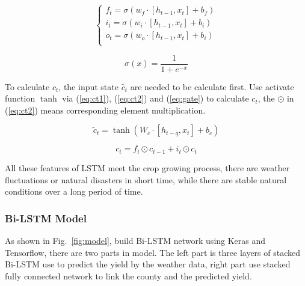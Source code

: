 \documentclass[conference]{IEEEtran}
\begin{document}
      \begin{equation}
        \begin{cases}	f_t=\sigma \left( w_f\cdot \left[ h_{t-1},x_t \right] +b_f \right)\\	i_t=\sigma \left( w_i\cdot \left[ h_{t-1},x_t \right] +b_i \right)\\	o_t=\sigma \left( w_o\cdot \left[ h_{t-1},x_t \right] +b_i \right)\\\end{cases}
        \label{eq:gate}
      \end{equation}

      \begin{equation}
        \sigma \left( x \right) =\frac{1}{1+e^{-x}}
        \label{eq:sigmoid}
      \end{equation}

      To calculate $c_t$, the input state $\widetilde{c_t}$ are needed to be calculate first. Use activate function $\tanh$ via (\ref{eq:ct1}), (\ref{eq:ct2}) and (\ref{eq:gate}) to calculate $c_t$, the $\odot$ in (\ref{eq:ct2}) means corresponding element multiplication.

      \begin{equation}
        \tilde{c}_t=\tanh \left( W_c\cdot \left[ h_{t-q},x_t \right] +b_c \right)
        \label{eq:ct1}
      \end{equation}

      \begin{equation}
        c_t=f_t\odot c_{t-1}+i_t\odot c_t
        \label{eq:ct2}
      \end{equation}

      All these features of LSTM meet the crop growing process, there are weather fluctuations or natural disasters in short time, while there are stable natural conditions over a long period of time.

    \subsubsection{Bi-LSTM Model}
      As shown in Fig.~\ref{fig:model}, build Bi-LSTM network using Keras and Tensorflow, there are two parts in model. The left part is three layers of stacked Bi-LSTM use to predict the yield by the weather data, right part use stacked fully connected network to link the county and the predicted yield.
\end{document}
